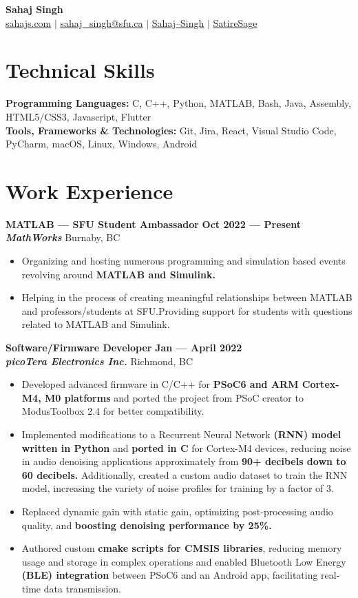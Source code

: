 \documentclass[letterpaper,11pt]{article}
\newcommand{\contact} [5] {
    \begin{center}
        \textbf{\color{colorValue}\Huge #1} \\ \vspace{1pt}
        \small \href{https://#2}{\faIcon{code} \underline{#2}} $|$ \href{mailto:#3}{\faIcon{envelope} \underline{#3}} $|$ 
        \href{#4}{\faIcon{linkedin} \underline{Sahaj--Singh}} $|$
        \href{#5}{\faIcon{github} \underline{SatireSage}}
    \end{center}
}
\newcommand{\Item} [1] {
    \item\small{{#1 \vspace{-2pt}}}
}
\newcommand{\employer} [5] {
    {\textbf{#3} \hfill \textbf{#4 --- #5}\\ \textbf{\emph{#1}} \hfill #2\\}
}
\newcommand{\workItemListStart} [0] {
    \vspace{-1pt}
    \begin{itemize}[leftmargin=*,topsep=0pt,itemsep=-2pt]
}
\newcommand{\workItemListEnd} [0] {
    \end{itemize}
    \vspace{1pt}
}
\begin{document}
    \vspace*{-30pt}

    \contact{Sahaj Singh}{sahajs.com}{sahaj\_singh@sfu.ca}{https://www.linkedin.com/in/sahaj--singh/}{https://github.com/SatireSage}

    \section{Technical Skills}
    \begin{itemize}[leftmargin=0in, label={}]
    \small{\item{
        \textbf{Programming Languages:}{ C, C++, Python, MATLAB, Bash, Java, Assembly, HTML5/CSS3, Javascript, Flutter} \\
        \textbf{Tools, Frameworks \& Technologies:}{ Git, Jira, React, Visual Studio Code, PyCharm, macOS, Linux, Windows, Android} \\
    }}
    \end{itemize}

    \section{Work Experience}
    \employer{MathWorks}{Burnaby, BC}{MATLAB --- SFU Student Ambassador}{Oct 2022}{Present}
    \workItemListStart{}
        \Item{Organizing and hosting numerous programming and simulation based events revolving around \textbf{MATLAB and Simulink.}}
        \Item{Helping in the process of creating meaningful relationships between MATLAB and professors/students at SFU.\@ Providing support for students with questions related to MATLAB and Simulink.}
    \workItemListEnd{}
    \employer{picoTera Electronics Inc.}{Richmond, BC}{Software/Firmware Developer}{Jan}{April 2022}
    \workItemListStart{}
        \Item{Developed advanced firmware in C/C++ for \textbf{PSoC6 and ARM Cortex-M4, M0 platforms} and ported the project from PSoC creator to ModusToolbox 2.4 for better compatibility.}
        \Item{Implemented modifications to a Recurrent Neural Network \textbf{(RNN) model written in Python} and \textbf{ported in C} for Cortex-M4 devices, reducing noise in audio denoising applications approximately from \textbf{90+ decibels down to 60 decibels.} Additionally, created a custom audio dataset to train the RNN model, increasing the variety of noise profiles for training by a factor of 3.}
        \Item{Replaced dynamic gain with static gain, optimizing post-processing audio quality, and \textbf{boosting denoising performance by 25\%.}}
        \Item{Authored custom \textbf{cmake scripts for CMSIS libraries}, reducing memory usage and storage in complex operations and enabled Bluetooth Low Energy \textbf{(BLE) integration} between PSoC6 and an Android app, facilitating real-time data transmission.}
    \workItemListEnd{}
\end{document}
